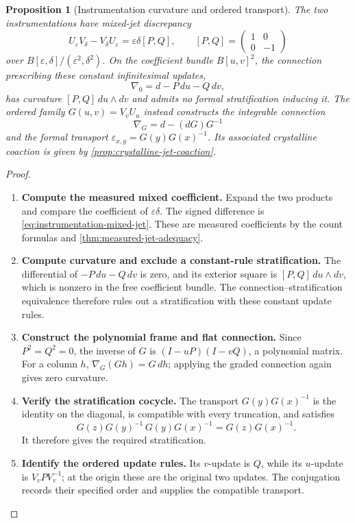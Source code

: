 \documentclass[11pt,a4paper]{article}
\numberwithin{algorithm}{section}
\numberwithin{equation}{section}
\newtheorem{proposition}[proposition]{Proposition}
\theoremstyle{definition}
\theoremstyle{remark}
\theoremstyle{plain}
\newcommand{\eps}{\varepsilon}
\theoremstyle{definition}
\theoremstyle{plain}
\begin{document}
\begin{proposition}[Instrumentation curvature and ordered transport]
\label{prop:instrumentation-curvature}
The two instrumentations have mixed-jet discrepancy
\begin{equation}\label{eq:instrumentation-mixed-jet}
 U_\eps V_\delta-V_\delta U_\eps
 =\eps\delta[P,Q],\qquad
 [P,Q]=\begin{pmatrix}1&0\\0&-1\end{pmatrix}
\end{equation}
over $B[\eps,\delta]/(\eps^2,\delta^2)$.
On the coefficient bundle $B[u,v]^2$, the connection prescribing
these constant infinitesimal updates,
\[
 \nabla_0=d-P\,du-Q\,dv,
\]
has curvature $[P,Q]\,du\wedge dv$ and admits no formal stratification
inducing it. The ordered family $G(u,v)=V_vU_u$ instead constructs
the integrable connection
\[
 \nabla_G=d-(dG)G^{-1}
\]
and the formal transport
$\varepsilon_{x,y}=G(y)G(x)^{-1}$. Its associated crystalline coaction
is given by \cref{prop:crystalline-jet-coaction}.
\end{proposition}
\begin{proof}\leavevmode
\begin{enumerate}[leftmargin=*,align=left]
\item \textbf{Compute the measured mixed coefficient.}
Expand the two products and compare the coefficient of $\eps\delta$.
The signed difference is \eqref{eq:instrumentation-mixed-jet}.
These are measured coefficients by the count formulas and
\cref{thm:measured-jet-adequacy}.

\item \textbf{Compute curvature and exclude a constant-rule stratification.}
The differential of
$-P\,du-Q\,dv$ is zero, and its exterior square is
$[P,Q]\,du\wedge dv$, which is nonzero in the free coefficient bundle.
The connection--stratification equivalence therefore rules out a
stratification with these constant update rules.

\item \textbf{Construct the polynomial frame and flat connection.}
Since $P^2=Q^2=0$, the inverse of $G$ is
$(I-uP)(I-vQ)$, a polynomial matrix. For a column $h$,
$\nabla_G(Gh)=G\,dh$; applying the graded connection again gives
zero curvature.

\item \textbf{Verify the stratification cocycle.}
The transport $G(y)G(x)^{-1}$ is the identity on the
diagonal, is compatible with every truncation, and satisfies
\[
 G(z)G(y)^{-1}\,G(y)G(x)^{-1}=G(z)G(x)^{-1}.
\]
It therefore gives the required stratification.

\item \textbf{Identify the ordered update rules.}
Its $v$-update is
$Q$, while its $u$-update is $V_vPV_v^{-1}$; at the origin these are
the original two updates. The conjugation records their specified
order and supplies the compatible transport.
\end{enumerate}
\end{proof}
\end{document}
